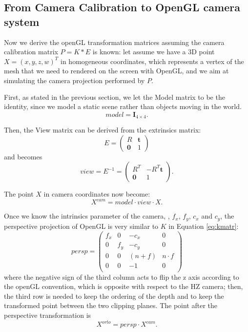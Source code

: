 \subsection{From Camera Calibration to OpenGL camera system}
Now we derive the openGL transformation matrices assuming the camera calibration matrix $P = K * E$ is known: let assume we have a 3D point $X = (x,y,z,w)^T$ in homogeneous coordinates, which represents a vertex of the mesh that we need to rendered on the screen with OpenGL, and we aim at simulating the camera projection performed by $P$.

First, as stated in the previous section, we let the Model matrix to be the identity, since we model a static scene rather than objects moving in the world.
\begin{equation}
  model = \mathbf{I}_{4\times4}.
\end{equation}

Then, the View matrix can be derived from the extrinsics matrix:
\begin{equation}
  E =
\begin{pmatrix}
R & \mathbf{t}\\
\mathbf{0}&1
 \end{pmatrix} 
\end{equation}
and becomes
\begin{equation}
  view = E^{-1}=
\begin{pmatrix}
R^T & -R^T\mathbf{t}\\
\mathbf{0}&1
 \end{pmatrix}.
\end{equation}

The point $X$ in camera coordinates now become:
\begin{equation}
 X^{cam} = model \cdot view \cdot X.
\end{equation}



Once we know the intrinsics parameter of the camera, \ie,  $f_x$, $f_y$, $c_x$ and $c_y$, the perspective projection of OpenGL is very similar to $K$ in Equation \eqref{eq:kmatr}:
\begin{equation}
 persp =
 \begin{pmatrix}
  f_x & 0   & -c_x    & 0\\
  0   & f_y & -c_y    & 0\\
  0   & 0   & (n+f) & n\cdot f\\
  0   & 0   & -1      & 0\\
 \end{pmatrix}
\end{equation}
where the negative sign of the third column acts to flip the z axis according to the openGL convention, which is opposite with respect to the HZ camera; then, the third row is needed to keep the ordering of the depth and to keep the transformed point between the two clipping planes.
The point after the perspective transformation is
\begin{equation}
 X^{orto} = persp \cdot X^{cam}.
\end{equation}

